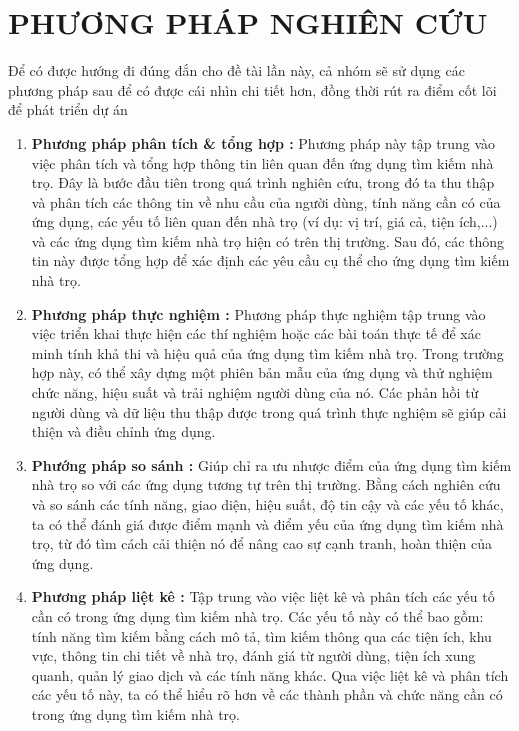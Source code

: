 \section{PHƯƠNG PHÁP NGHIÊN CỨU}
Để có được hướng đi đúng đắn cho đề tài lần này, cả nhóm sẽ sử dụng các phương pháp sau để có được cái nhìn chi tiết hơn, đồng thời rút ra điểm cốt lõi để phát triển dự án
\begin{enumerate}
    \item \textbf{Phương pháp phân tích \& tổng hợp :} Phương pháp này tập trung vào việc phân tích và tổng hợp thông tin liên quan đến ứng dụng tìm kiếm nhà trọ. Đây là bước đầu tiên trong quá trình nghiên cứu, trong đó ta thu thập và phân tích các thông tin về nhu cầu của người dùng, tính năng cần có của ứng dụng, các yếu tố liên quan đến nhà trọ (ví dụ: vị trí, giá cả, tiện ích,...) và các ứng dụng tìm kiếm nhà trọ hiện có trên thị trường. Sau đó, các thông tin này được tổng hợp để xác định các yêu cầu cụ thể cho ứng dụng tìm kiếm nhà trọ.
    \item \textbf{Phương pháp thực nghiệm :} Phương pháp thực nghiệm tập trung vào việc triển khai thực hiện các thí nghiệm hoặc các bài toán thực tế để xác minh tính khả thi và hiệu quả của ứng dụng tìm kiếm nhà trọ. Trong trường hợp này, có thể xây dựng một phiên bản mẫu của ứng dụng và thử nghiệm chức năng, hiệu suất và trải nghiệm người dùng của nó. Các phản hồi từ người dùng và dữ liệu thu thập được trong quá trình thực nghiệm sẽ giúp cải thiện và điều chỉnh ứng dụng.
    \item \textbf{Phướng pháp so sánh :} Giúp chỉ ra ưu nhược điểm của ứng dụng tìm kiếm nhà trọ so với các ứng dụng tương tự trên thị trường. Bằng cách nghiên cứu và so sánh các tính năng, giao diện, hiệu suất, độ tin cậy và các yếu tố khác, ta có thể đánh giá được điểm mạnh và điểm yếu của ứng dụng tìm kiếm nhà trọ, từ đó tìm cách cải thiện nó để nâng cao sự cạnh tranh, hoàn thiện của ứng dụng.
    \item \textbf{Phương pháp liệt kê :} Tập trung vào việc liệt kê và phân tích các yếu tố cần có trong ứng dụng tìm kiếm nhà trọ. Các yếu tố này có thể bao gồm: tính năng tìm kiếm bằng cách mô tả, tìm kiếm thông qua các tiện ích, khu vực, thông tin chi tiết về nhà trọ, đánh giá từ người dùng, tiện ích xung quanh, quản lý giao dịch và các tính năng khác. Qua việc liệt kê và phân tích các yếu tố này, ta có thể hiểu rõ hơn về các thành phần và chức năng cần có trong ứng dụng tìm kiếm nhà trọ.
\end{enumerate}